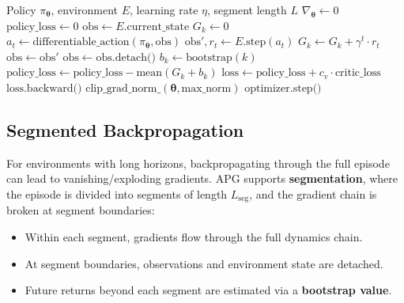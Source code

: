 \documentclass[11pt,a4paper]{article}
\newcommand{\btheta}{\bm{\theta}}
\begin{document}
\begin{algorithm}[htbp]
  \caption{APG Training Iteration}
  \label{alg:apg}
  \begin{algorithmic}[1]
    \Require Policy $\pi_{\btheta}$, environment $E$, learning rate $\eta$, segment length $L$
      \State $\nabla_{\btheta} \leftarrow 0$
      \State $\text{policy\_loss} \leftarrow 0$
      \State $\text{obs} \leftarrow E.\text{current\_state}$
        \State $G_k \leftarrow 0$
          \State $a_t \leftarrow \text{differentiable\_action}(\pi_{\btheta}, \text{obs})$ 
          \State $\text{obs}', r_t \leftarrow E.\text{step}(a_t)$ 
          \State $G_k \leftarrow G_k + \gamma^t \cdot r_t$
          \State $\text{obs} \leftarrow \text{obs}'$
        \EndFor
        \State $\text{obs} \leftarrow \text{obs}.\text{detach()}$ 
        \State $b_k \leftarrow \text{bootstrap}(k)$ 
        \State $\text{policy\_loss} \leftarrow \text{policy\_loss} - \text{mean}(G_k + b_k)$
      \EndFor
      \State $\text{loss} \leftarrow \text{policy\_loss} + c_v \cdot \text{critic\_loss}$ 
      \State $\text{loss}.\text{backward()}$
      \State $\text{clip\_grad\_norm}\_(\btheta, \text{max\_norm})$
      \State $\text{optimizer}.\text{step()}$
    \EndFor
  \end{algorithmic}
\end{algorithm}

\subsection{Segmented Backpropagation}
\label{sec:segmentation}

For environments with long horizons, backpropagating through the full episode can lead to vanishing/exploding gradients. APG supports \textbf{segmentation}, where the episode is divided into segments of length $L_{\text{seg}}$, and the gradient chain is broken at segment boundaries:
\begin{itemize}
  \item Within each segment, gradients flow through the full dynamics chain.
  \item At segment boundaries, observations and environment state are detached.
  \item Future returns beyond each segment are estimated via a \textbf{bootstrap value}.
\end{itemize}
\end{document}

